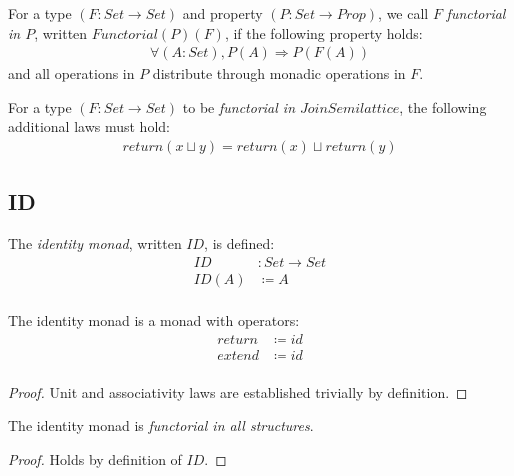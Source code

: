 \documentclass{article}
\begin{document}
\begin{definition}
For a type $(F : Set → Set)$ and property $(P : Set → Prop)$, we call $F$ \emph{functorial in $P$}, written $Functorial(P)(F)$, if the following property holds:
\begin{align*}
∀ (A : Set), P(A) ⇒ P (F(A))
\end{align*}
and all operations in $P$ distribute through monadic operations in $F$.
\end{definition}

\begin{example}
For a type $(F : Set → Set)$ to be \emph{functorial in $JoinSemilattice$}, the following additional laws must hold:
\begin{align*}
return (x ⊔ y) = return(x) ⊔ return(y)
\end{align*}
\end{example}


\subsection{ID}
\label{ID}

\begin{definition}
The \emph{identity monad}, written $ID$, is defined:
\begin{align*}
   ID &: Set → Set \\
ID(A) &≔ A         \\
\end{align*}
\end{definition}

\begin{lemma}
The identity monad is a monad with operators:
\begin{align*}
return &≔ id \\
extend &≔ id \\
\end{align*}
\begin{proof}
Unit and associativity laws are established trivially by definition.
\end{proof}
\end{lemma}

\begin{lemma}
The identity monad is \emph{functorial in all structures}.
\begin{proof}
Holds by definition of $ID$.
\end{proof}
\end{lemma}

\end{document}
